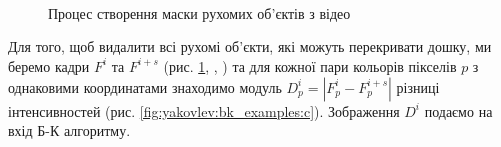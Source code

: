 \begin{figure}[H]
	\centering
	\\
	\\
	\\
	\caption{Процес створення маски рухомих об'єктів з відео \cite{yakovlev_discrete_math_video}
		\label{fig:yakovlev:bk_examples}
	}
\end{figure}

Для того, щоб видалити всі рухомі об'єкти, які можуть перекривати дошку, ми
беремо кадри \(F^{i}\) та \(F^{i + s}\) (рис. \ref{fig:yakovlev:bk_examples},
,
) та для
кожної пари кольорів пікселів \(p\) з однаковими координатами знаходимо
модуль \(D_{p}^{i} = \left| F_{p}^{i} - F_{p}^{i + s} \right|\) різниці
інтенсивностей (рис. \ref{fig:yakovlev:bk_examples:c}). Зображення \(D^{i}\) подаємо на вхід
Б-К алгоритму.

